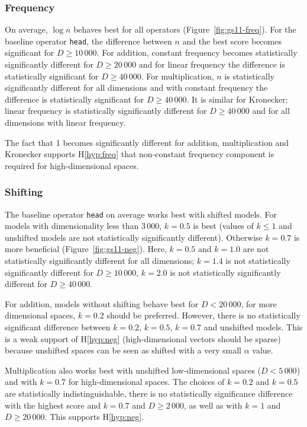 \subsubsection{Frequency}


On average, $\log n$ behaves best for all operators (Figure~\ref{fig:gs11-freq}). For the baseline operator \texttt{head}, the difference between $n$ and the best score becomes significant for $D \ge 10\,000$. For addition, constant frequency becomes statistically significantly different for $D \ge 20\,000$ and for linear frequency the difference is statistically significant for $D \ge 40\,000$. For multiplication, $n$ is statistically significantly different for all dimensions and with constant frequency the difference is statistically significant for $D \ge 40\,000$. It is similar for Kronecker: linear frequency is statistically significantly different for $D \ge 40\,000$ and for all dimensions with linear frequency.

The fact that 1 becomes significantly different for addition, multiplication and Kronecker supports H\ref{hyp:freq} that non-constant frequency component is required for high-dimensional spaces.

\subsubsection{Shifting}

The baseline operator \texttt{head} on average works best with shifted models. For models with dimensionality less than 3\,000, $k = 0.5$ is best (values of $k \le 1$ and unshifted models are not statistically significantly different). Otherwise $k = 0.7$ is more beneficial (Figure~\ref{fig:gs11-neg}). Here, $k=0.5$ and $k=1.0$ are not statistically significantly different for all dimensions; $k=1.4$ is not statistically significantly different for $D \ge 10\,000$, $k=2.0$ is not statistically significantly different for $D \ge 40\,000$.

For addition, models without shifting behave best for $D < 20\,000$, for more dimensional spaces, $k = 0.2$ should be preferred. However, there is no statistically significant difference between $k=0.2$, $k=0.5$, $k=0.7$ and unshifted models. This is a weak support of H\ref{hyp:neg} (high-dimensional vectors should be sparse) because unshifted spaces can be seen as shifted with a very small $\alpha$ value.

Multiplication also works best with unshifted low-dimensional spaces ($D < 5\,000$) and with $k = 0.7$ for high-dimensional spaces. The choices of $k=0.2$ and $k=0.5$ are statistically indistinguishable, there is no statistically significance difference with the highest score and $k=0.7$ and $D \ge 2\,000$, as well as with $k=1$ and $D \ge 20\,000$. This supports H\ref{hyp:neg}.

